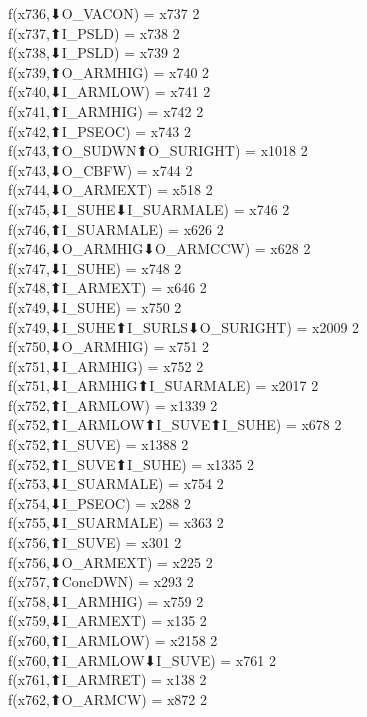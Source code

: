 f(x736,⬇O_VACON) = x737 {2} \\
f(x737,⬆I_PSLD) = x738 {2} \\
f(x738,⬇I_PSLD) = x739 {2} \\
f(x739,⬆O_ARMHIG) = x740 {2} \\
f(x740,⬇I_ARMLOW) = x741 {2} \\
f(x741,⬆I_ARMHIG) = x742 {2} \\
f(x742,⬆I_PSEOC) = x743 {2} \\
f(x743,⬆O_SUDWN⬆O_SURIGHT) = x1018 {2} \\
f(x743,⬇O_CBFW) = x744 {2} \\
f(x744,⬇O_ARMEXT) = x518 {2} \\
f(x745,⬇I_SUHE⬇I_SUARMALE) = x746 {2} \\
f(x746,⬆I_SUARMALE) = x626 {2} \\
f(x746,⬇O_ARMHIG⬇O_ARMCCW) = x628 {2} \\
f(x747,⬇I_SUHE) = x748 {2} \\
f(x748,⬆I_ARMEXT) = x646 {2} \\
f(x749,⬇I_SUHE) = x750 {2} \\
f(x749,⬇I_SUHE⬆I_SURLS⬇O_SURIGHT) = x2009 {2} \\
f(x750,⬇O_ARMHIG) = x751 {2} \\
f(x751,⬇I_ARMHIG) = x752 {2} \\
f(x751,⬇I_ARMHIG⬆I_SUARMALE) = x2017 {2} \\
f(x752,⬆I_ARMLOW) = x1339 {2} \\
f(x752,⬆I_ARMLOW⬆I_SUVE⬆I_SUHE) = x678 {2} \\
f(x752,⬆I_SUVE) = x1388 {2} \\
f(x752,⬆I_SUVE⬆I_SUHE) = x1335 {2} \\
f(x753,⬇I_SUARMALE) = x754 {2} \\
f(x754,⬇I_PSEOC) = x288 {2} \\
f(x755,⬇I_SUARMALE) = x363 {2} \\
f(x756,⬆I_SUVE) = x301 {2} \\
f(x756,⬇O_ARMEXT) = x225 {2} \\
f(x757,⬆ConcDWN) = x293 {2} \\
f(x758,⬇I_ARMHIG) = x759 {2} \\
f(x759,⬇I_ARMEXT) = x135 {2} \\
f(x760,⬆I_ARMLOW) = x2158 {2} \\
f(x760,⬆I_ARMLOW⬇I_SUVE) = x761 {2} \\
f(x761,⬆I_ARMRET) = x138 {2} \\
f(x762,⬆O_ARMCW) = x872 {2} \\
